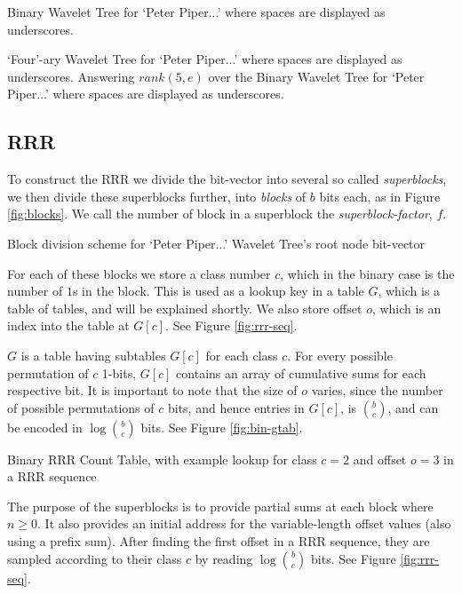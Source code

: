 			{Binary Wavelet Tree for `Peter Piper...' where spaces are displayed
			as underscores.}
			
			{`Four'-ary Wavelet Tree for `Peter Piper...' where spaces are 
			displayed as underscores.}
\clearpage
			{Answering $rank(5, e)$ over the Binary Wavelet Tree for `Peter
			Piper...' where spaces are displayed as underscores.}

\subsection{RRR}
To construct the RRR we divide the bit-vector into several so called 
\emph{superblocks}, we then divide these superblocks further, into 
\emph{blocks} of $b$ bits each, as in Figure \ref{fig:blocks}. We call the 
number of block in a superblock the \emph{superblock-factor}, $f$.

			{Block division scheme for `Peter Piper...' Wavelet Tree's root
			node bit-vector}

For each of these blocks we store a class number $c$, which in the binary case 
is the number of  $1$s in the block. This is used as a lookup key in a table 
$G$, which is a table of tables, and will be explained shortly. We also store 
offset $o$, which is an index into the table at $G[c]$. See Figure 
\ref{fig:rrr-seq}.

$G$ is a table having subtables $G[c]$ for each class $c$. For every possible 
permutation of $c$ 1-bits, $G[c]$ contains an array of cumulative sums for each 
respective bit. It is important to note that the size of $o$ varies, since 
the number of possible permutations of $c$ bits, and hence entries in $G[c]$, is $b \choose c$, and can be encoded in $\log {b \choose c}$ bits. See Figure \ref{fig:bin-gtab}.

			{Binary RRR Count Table, with example lookup for class $c = 2$
			and offset $o = 3$ in a RRR sequence}

The purpose of the superblocks is to provide partial sums at each block where $n 
\ge 0$. It also provides an initial address for the variable-length offset 
values (also using a prefix sum). After finding the first offset in a RRR
sequence, they are sampled according to their class $c$ by reading $\log {b 
\choose c}$ bits. See Figure \ref{fig:rrr-seq}.

